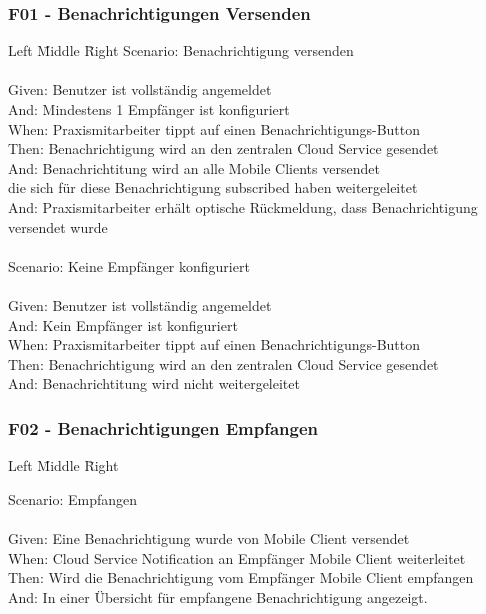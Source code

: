 \subsubsection*{F01 - Benachrichtigungen Versenden}
\begin{tabbing}
    Left \= Middle \= Right \kill
    Scenario: \> \> Benachrichtigung versenden\\ \\
    Given:  \> \> Benutzer ist vollständig angemeldet\\
    And:    \> \> Mindestens 1 Empfänger ist konfiguriert\\
    When:  \> \> Praxismitarbeiter tippt auf einen Benachrichtigungs-Button\\
    Then:   \> \> Benachrichtigung wird an den zentralen Cloud Service gesendet\\
    And:    \> \> Benachrichtitung wird an alle Mobile Clients versendet\\
    \> \> die sich für diese Benachrichtigung subscribed haben weitergeleitet\\
    And:    \> \> Praxismitarbeiter erhält optische Rückmeldung, dass Benachrichtigung versendet wurde\\

    \\
    Scenario: \> \> Keine Empfänger konfiguriert\\ \\
    Given:  \> \>  Benutzer ist vollständig angemeldet\\
    And:  \> \>    Kein Empfänger ist konfiguriert\\
    When:  \> \>   Praxismitarbeiter tippt auf einen Benachrichtigungs-Button\\
    Then:  \> \>   Benachrichtigung wird an den zentralen Cloud Service gesendet\\
    And:  \> \>    Benachrichtitung wird nicht weitergeleitet\\

\end{tabbing}


\subsubsection*{F02 - Benachrichtigungen Empfangen}
\begin{tabbing}
    Left \= Middle \= Right \kill

    Scenario:  \> \> Empfangen\\ \\
    Given:  \> \>  Eine Benachrichtigung wurde von Mobile Client versendet\\
    When:  \> \>   Cloud Service Notification an Empfänger Mobile Client weiterleitet\\
    Then:  \> \>   Wird die Benachrichtigung vom Empfänger Mobile Client empfangen\\
    And:  \> \>    In einer Übersicht für empfangene Benachrichtigung angezeigt.\\

\end{tabbing}

